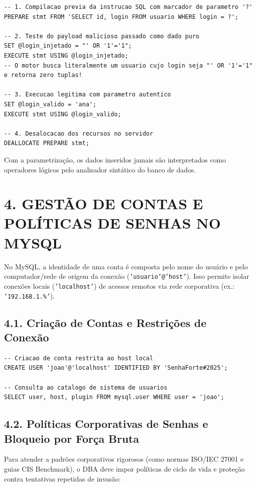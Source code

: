 \begin{lstlisting}
-- 1. Compilacao previa da instrucao SQL com marcador de parametro '?'
PREPARE stmt FROM 'SELECT id, login FROM usuario WHERE login = ?';

-- 2. Teste do payload malicioso passado como dado puro
SET @login_injetado = "' OR '1'='1";
EXECUTE stmt USING @login_injetado;
-- O motor busca literalmente um usuario cujo login seja "' OR '1'='1" e retorna zero tuplas!

-- 3. Execucao legitima com parametro autentico
SET @login_valido = 'ana';
EXECUTE stmt USING @login_valido;

-- 4. Desalocacao dos recursos no servidor
DEALLOCATE PREPARE stmt;
\end{lstlisting}

Com a parametrização, os dados inseridos jamais são interpretados como operadores lógicos pelo analisador sintático do banco de dados.

\newpage

\section*{4. GESTÃO DE CONTAS E POLÍTICAS DE SENHAS NO MYSQL}

No MySQL, a identidade de uma conta é composta pelo nome do usuário e pelo computador/rede de origem da conexão (\texttt{'usuario'@'host'}). Isso permite isolar conexões locais (\texttt{'localhost'}) de acessos remotos via rede corporativa (ex.: \texttt{'192.168.1.\%'}).

\subsection*{4.1. Criação de Contas e Restrições de Conexão}

\begin{lstlisting}
-- Criacao de conta restrita ao host local
CREATE USER 'joao'@'localhost' IDENTIFIED BY 'SenhaForte#2025';

-- Consulta ao catalogo de sistema de usuarios
SELECT user, host, plugin FROM mysql.user WHERE user = 'joao';
\end{lstlisting}

\subsection*{4.2. Políticas Corporativas de Senhas e Bloqueio por Força Bruta}

Para atender a padrões corporativos rigorosos (como normas ISO/IEC 27001 e guias CIS Benchmark), o DBA deve impor políticas de ciclo de vida e proteção contra tentativas repetidas de invasão:

